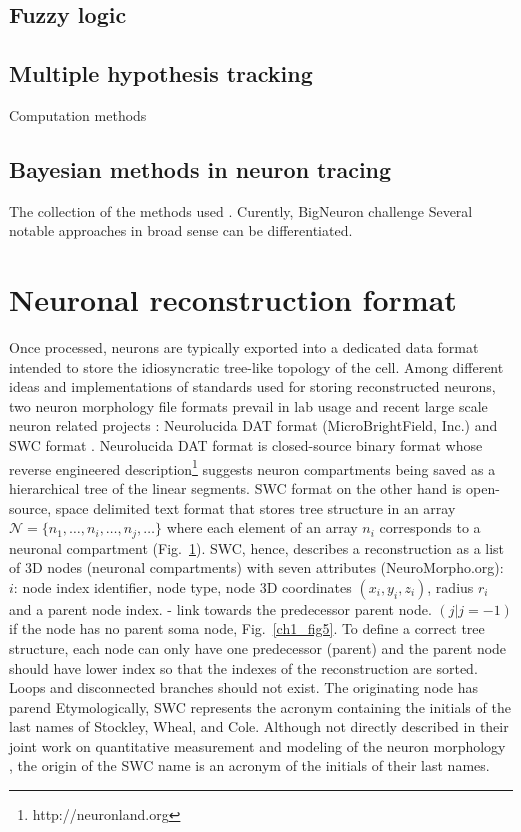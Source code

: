 \subsection{Fuzzy logic }

\subsection{Multiple hypothesis tracking}
Computation methods

\subsection{Bayesian methods in neuron tracing} 
The collection of the methods used . Curently, BigNeuron challenge Several notable approaches in broad sense can be differentiated. 


\section{Neuronal reconstruction format}
Once processed, neurons are typically exported into a dedicated data format intended to store the idiosyncratic tree-like topology of the cell. Among different ideas and implementations of standards used for storing reconstructed neurons, two neuron morphology file formats prevail in lab usage and recent large scale neuron related projects \cite{bakker2016web}: Neurolucida DAT format (MicroBrightField, Inc.) and SWC format \cite{cannon1998line}. Neurolucida DAT format is closed-source binary format whose reverse engineered description\footnote{http://neuronland.org} suggests neuron compartments being saved as a hierarchical tree of the linear segments. SWC format on the other hand is open-source, space delimited text format that stores tree structure in an array $\mathcal{N} = \{ n_1, \dots , n_i, \dots , n_j, \dots  \}$ where each element of an array $n_i$ corresponds to a neuronal compartment (Fig.~\ref{}). SWC, hence, describes a reconstruction as a list of 3D nodes (neuronal compartments) with seven attributes (NeuroMorpho.org):  $i$: node index identifier, node type, node 3D coordinates $(x_i,y_i,z_i)$, radius $r_i$ and a parent node index.  - link towards the predecessor parent node. $(j | j=-1)$ if the node has no parent soma node, Fig.~\ref{ch1_fig5}. To define a correct tree structure, each node can only have one predecessor (parent) and the parent node should have lower index so that the indexes of the reconstruction are sorted. Loops and disconnected branches should not exist. The originating node has parend  Etymologically, SWC represents the acronym containing the initials of the last names of Stockley, Wheal, and Cole. Although not directly described in their joint work on quantitative measurement and modeling of the neuron morphology \cite{stockley1993system}, the origin of the SWC name is an acronym of the initials of their last names. 

